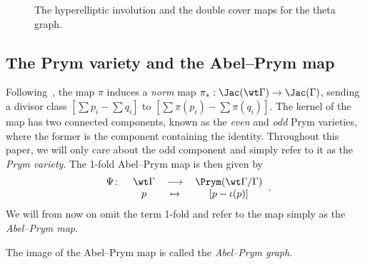 \begin{exam}
\begin{figure}[ht]
 \caption{The hyperelliptic involution and the double cover maps for the theta graph.}
    \label{abel1}
\end{figure}

\end{exam}

\subsection{The Prym variety and the Abel--Prym map}



Following~\cite[Section 1.4]{LenUlirsch_Prym}, the map $\pi$ induces a \emph{norm} map $\pi_*:\Jac(\wt\Gamma)\to\Jac(\Gamma)$, sending a divisor class $[\sum p_i - \sum q_i]$ to $[\sum \pi(p_i) - \sum \pi(q_i)]$. The kernel of the map has two connected components, known as the \emph{even} and \emph{odd}
 Prym varieties, where the former is the component containing the identity.
 Throughout this paper, we will only care about the odd component and simply refer to it as the \emph{Prym variety}.    The 1-fold Abel--Prym map is then given by
 \[
 \begin{tabular}{cccc}	    $\Psi\colon$ & $\wt \Gamma $ & $\longrightarrow$&$\Prym(\wt \Gamma/\Gamma)$  \\
	         &$p$&$\mapsto$&$[p - \iota(p)]$ \\
	    \end{tabular}.
\]
We will from now on omit the term 1-fold and refer to the map simply as the \emph{Abel--Prym map}.

\begin{defi}
    The image of the  Abel--Prym map is called the \emph{Abel--Prym graph}.

\end{defi}



